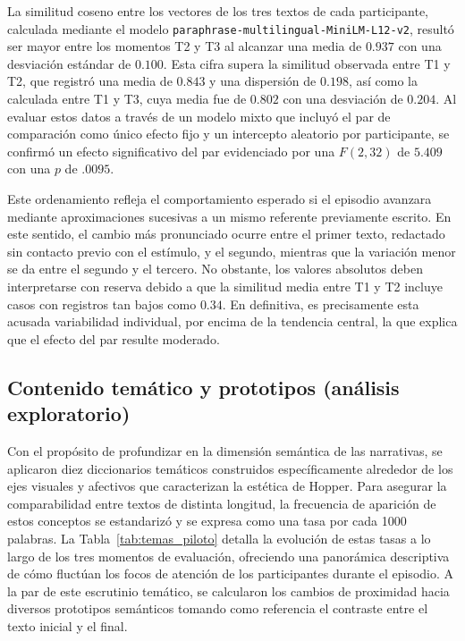 \documentclass[12pt]{article}
\begin{document}
	La similitud coseno entre los vectores de los tres textos de cada participante, calculada mediante el modelo \texttt{paraphrase-multilingual-MiniLM-L12-v2}, resultó ser mayor entre los momentos T2 y T3 al alcanzar una media de $0.937$ con una desviación estándar de $0.100$. Esta cifra supera la similitud observada entre T1 y T2, que registró una media de $0.843$ y una dispersión de $0.198$, así como la calculada entre T1 y T3, cuya media fue de $0.802$ con una desviación de $0.204$. Al evaluar estos datos a través de un modelo mixto que incluyó el par de comparación como único efecto fijo y un intercepto aleatorio por participante, se confirmó un efecto significativo del par evidenciado por una $F(2,32)$ de $5.409$ con una $p$ de $.0095$.
	
	Este ordenamiento refleja el comportamiento esperado si el episodio avanzara mediante aproximaciones sucesivas a un mismo referente previamente escrito. En este sentido, el cambio más pronunciado ocurre entre el primer texto, redactado sin contacto previo con el estímulo, y el segundo, mientras que la variación menor se da entre el segundo y el tercero. No obstante, los valores absolutos deben interpretarse con reserva debido a que la similitud media entre T1 y T2 incluye casos con registros tan bajos como $0.34$. En definitiva, es precisamente esta acusada variabilidad individual, por encima de la tendencia central, la que explica que el efecto del par resulte moderado.
	
	\subsection{Contenido temático y prototipos (análisis exploratorio)}
	
	Con el propósito de profundizar en la dimensión semántica de las narrativas, se aplicaron diez diccionarios temáticos construidos específicamente alrededor de los ejes visuales y afectivos que caracterizan la estética de Hopper. Para asegurar la comparabilidad entre textos de distinta longitud, la frecuencia de aparición de estos conceptos se estandarizó y se expresa como una tasa por cada 1000 palabras. La Tabla~\ref{tab:temas_piloto} detalla la evolución de estas tasas a lo largo de los tres momentos de evaluación, ofreciendo una panorámica descriptiva de cómo fluctúan los focos de atención de los participantes durante el episodio. A la par de este escrutinio temático, se calcularon los cambios de proximidad hacia diversos prototipos semánticos tomando como referencia el contraste entre el texto inicial y el final.
	
\end{document}
